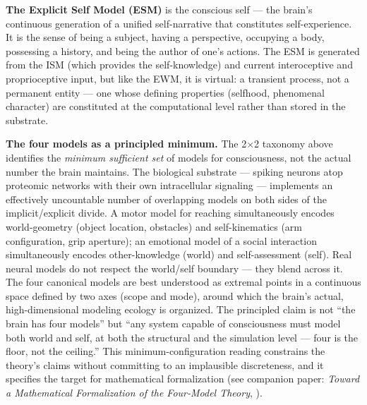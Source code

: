 \documentclass[12pt]{article}
\begin{document}
\textbf{The Explicit Self Model (ESM)} is the conscious self --- the brain's continuous generation of a unified self-narrative that constitutes self-experience. It is the sense of being a subject, having a perspective, occupying a body, possessing a history, and being the author of one's actions. The ESM is generated from the ISM (which provides the self-knowledge) and current interoceptive and proprioceptive input, but like the EWM, it is virtual: a transient process, not a permanent entity --- one whose defining properties (selfhood, phenomenal character) are constituted at the computational level rather than stored in the substrate.

\textbf{The four models as a principled minimum.} The 2$\times$2 taxonomy above identifies the \emph{minimum sufficient set} of models for consciousness, not the actual number the brain maintains. The biological substrate --- spiking neurons atop proteomic networks with their own intracellular signaling --- implements an effectively uncountable number of overlapping models on both sides of the implicit/explicit divide. A motor model for reaching simultaneously encodes world-geometry (object location, obstacles) and self-kinematics (arm configuration, grip aperture); an emotional model of a social interaction simultaneously encodes other-knowledge (world) and self-assessment (self). Real neural models do not respect the world/self boundary --- they blend across it. The four canonical models are best understood as extremal points in a continuous space defined by two axes (scope and mode), around which the brain's actual, high-dimensional modeling ecology is organized. The principled claim is not ``the brain has four models'' but ``any system capable of consciousness must model both world and self, at both the structural and the simulation level --- four is the floor, not the ceiling.'' This minimum-configuration reading constrains the theory's claims without committing to an implausible discreteness, and it specifies the target for mathematical formalization (see companion paper: \emph{Toward a Mathematical Formalization of the Four-Model Theory}, \citealp{Gruber2026b}).
\end{document}
